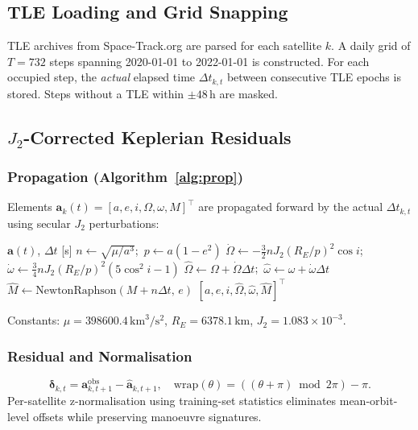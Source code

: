\documentclass[journal]{IEEEtran}
\begin{document}
\subsection{TLE Loading and Grid Snapping}
TLE archives from Space-Track.org are parsed for each satellite $k$.
A daily grid of $T=732$ steps spanning 2020-01-01 to 2022-01-01 is
constructed. For each occupied step, the \emph{actual} elapsed time
$\Delta t_{k,t}$ between consecutive TLE epochs is stored. Steps without
a TLE within $\pm48$\,h are masked.

\subsection{$J_2$-Corrected Keplerian Residuals}

\subsubsection{Propagation (Algorithm~\ref{alg:prop})}
Elements $\mathbf{a}_k(t) = [a,e,i,\Omega,\omega,M]^\top$ are propagated
forward by the actual $\Delta t_{k,t}$ using secular $J_2$ perturbations:

\begin{algorithm}[h]
\small\caption{$J_2$-Corrected Propagation}\label{alg:prop}
\begin{algorithmic}[1]
  \Require $\mathbf{a}(t)$, $\Delta t$ [s]
  \State $n\gets\sqrt{\mu/a^3}$;\ $p\gets a(1-e^2)$
  \State $\dot\Omega\gets-\tfrac{3}{2}nJ_2(R_E/p)^2\cos i$;\ $\dot\omega\gets\tfrac{3}{4}nJ_2(R_E/p)^2(5\cos^2i-1)$
  \State $\hat\Omega\gets\Omega+\dot\Omega\Delta t$;\ $\hat\omega\gets\omega+\dot\omega\Delta t$
  \State $\hat M\gets\text{NewtonRaphson}(M+n\Delta t,\,e)$
  \State \Return $[a,e,i,\hat\Omega,\hat\omega,\hat M]^\top$
\end{algorithmic}
\end{algorithm}

Constants: $\mu=398600.4\,\text{km}^3/\text{s}^2$, $R_E=6378.1\,\text{km}$,
$J_2=1.083\times10^{-3}$.

\subsubsection{Residual and Normalisation}
\begin{equation}
  \boldsymbol\delta_{k,t} = \mathbf{a}^\text{obs}_{k,t+1} - \hat{\mathbf{a}}_{k,t+1},\quad
  \text{wrap}(\theta) = ((\theta{+}\pi)\bmod 2\pi)-\pi.
\end{equation}
Per-satellite z-normalisation using training-set statistics eliminates
mean-orbit-level offsets while preserving manoeuvre signatures.
\end{document}
